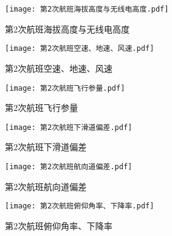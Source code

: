 \documentclass{MathorCupModeling}
\begin{document}
	\begin{figure}[H]
		\centering
		\begin{minipage}{0.48\linewidth}
			\centering
			\texttt{[image: 第2次航班海拔高度与无线电高度.pdf]}
			\caption{第2次航班海拔高度与无线电高度}
			\label{fig:第2次航班海拔高度与无线电高度}
		\end{minipage}
		\begin{minipage}{0.48\linewidth}
			\centering
			\texttt{[image: 第2次航班空速、地速、风速.pdf]}
			\caption{第2次航班空速、地速、风速}
			\label{fig:第2次航班空速、地速、风速}
		\end{minipage}
	\end{figure}
	\begin{figure}[H]
		\centering
		\begin{minipage}{0.48\linewidth}
			\centering
			\texttt{[image: 第2次航班飞行参量.pdf]}
			\caption{第2次航班飞行参量}
			\label{fig:第2次航班飞行参量}
		\end{minipage}
		\begin{minipage}{0.48\linewidth}
			\centering
			\texttt{[image: 第2次航班下滑道偏差.pdf]}
			\caption{第2次航班下滑道偏差}
			\label{fig:第2次航班下滑道偏差}
		\end{minipage}
	\end{figure}
	\begin{figure}[H]
		\centering
		\begin{minipage}{0.48\linewidth}
			\centering
			\texttt{[image: 第2次航班航向道偏差.pdf]}
			\caption{第2次航班航向道偏差}
			\label{fig:第2次航班航向道偏差}
		\end{minipage}
		\begin{minipage}{0.48\linewidth}
			\centering
			\texttt{[image: 第2次航班俯仰角率、下降率.pdf]}
			\caption{第2次航班俯仰角率、下降率}
			\label{fig:第2次航班俯仰角率、下降率}
		\end{minipage}
	\end{figure}
\end{document}
